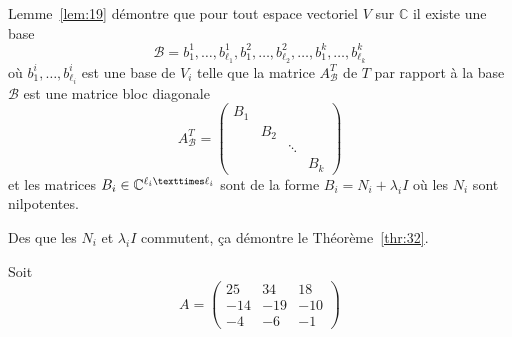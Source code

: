 \begin{remark}
  \label{rem:3}
  Lemme~\ref{lem:19} démontre que pour tout espace vectoriel $V$ sur $\mathbb{C}$ il existe une base 
  \begin{displaymath}
  \mathscr{B} =   b_1^1,\dots,b_{\ell_1}^1,b_1^2,\dots,b_{\ell_2}^2,\dots,b_1^k,\dots,b_{\ell_k}^k
  \end{displaymath}
  où $b_1^i,\dots,b_{\ell_i}^i$ est une base de $V_i$ telle que la matrice $A^T_\mathscr{B}$ de $T$ par rapport à la base $\mathscr{B}$ est une matrice bloc diagonale 
  \begin{displaymath}
      A^T_{\mathscr{B} }  =
      \begin{pmatrix}
        B_1 \\
        & B_2 \\
        & & \ddots \\
        & &  & B_k
      \end{pmatrix}
  \end{displaymath}
  et les matrices $B_i \in \C^{\ell_i × \ell_i}$ sont de la forme $B_i = N_i + λ_i I$ où les $N_i$ sont  nilpotentes.


  
Des que  les $N_i$ et $ λ_i I$ commutent, ça démontre le Théorème~\ref{thr:32}. 


\begin{example}
  \label{exe:47}
  Soit
  \begin{displaymath}
    A = \left(\begin{array}{rrr}
25 & 34 & 18 \\
-14 & -19 & -10 \\
-4 & -6 & -1
\end{array}\right)
\end{displaymath}


\end{example}
\end{remark}
